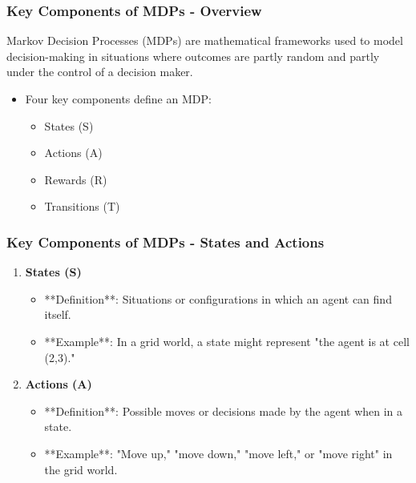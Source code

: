 \documentclass{beamer}
\begin{document}
\begin{frame}[fragile]
    \frametitle{Key Components of MDPs - Overview}
    Markov Decision Processes (MDPs) are mathematical frameworks used to model decision-making in situations where outcomes are partly random and partly under the control of a decision maker. 
    \begin{itemize}
        \item Four key components define an MDP:
        \begin{itemize}
            \item States (S)
            \item Actions (A)
            \item Rewards (R)
            \item Transitions (T)
        \end{itemize}
    \end{itemize}
\end{frame}

\begin{frame}[fragile]
    \frametitle{Key Components of MDPs - States and Actions}
    \begin{enumerate}
        \item \textbf{States (S)}
        \begin{itemize}
            \item **Definition**: Situations or configurations in which an agent can find itself.
            \item **Example**: In a grid world, a state might represent "the agent is at cell (2,3)."
        \end{itemize}
        
        \item \textbf{Actions (A)}
        \begin{itemize}
            \item **Definition**: Possible moves or decisions made by the agent when in a state.
            \item **Example**: "Move up," "move down," "move left," or "move right" in the grid world.
        \end{itemize}
    \end{enumerate}
\end{frame}
\end{document}
